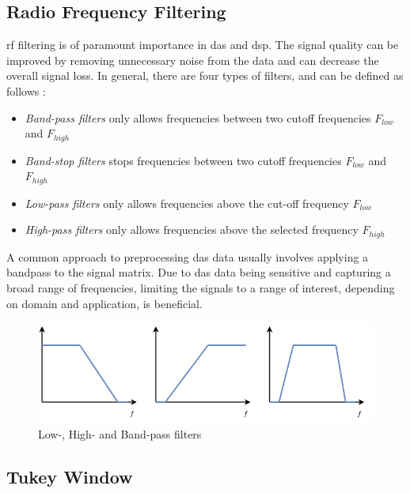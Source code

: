 \subsection{Radio Frequency Filtering}
%
\acrfull{rf} filtering is of paramount importance in \acrshort{das} and \acrfull{dsp}. The signal quality can be improved by removing unnecessary noise from the data and can decrease the overall signal loss. In general, there are four types of filters, and can be defined as follows \cite{cdt21_filters}:
%
\begin{itemize}
    \item \textit{Band-pass filters} only allows frequencies between two cutoff frequencies $F_{low}$ and $F_{high}$
    \item \textit{Band-stop filters} stops frequencies between two cutoff frequencies $F_{low}$ and $F_{high}$
    \item \textit{Low-pass filters} only allows frequencies above the cut-off frequency $F_{low}$
    \item \textit{High-pass filters} only allows frequencies above the selected frequency $F_{high}$
\end{itemize}
%
A common approach to preprocessing \acrshort{das} data usually involves applying a bandpass to the signal matrix. Due to \acrshort{das} data being sensitive and capturing a broad range of frequencies, limiting the signals to a range of interest, depending on domain and application, is beneficial.

\vspace{0.5cm}

\begin{figure}[!h]
    \centering
    \includegraphics[width=0.8\linewidth]{figures/lowhighpass.png}
    \caption{Low-, High- and Band-pass filters}
    \label{fig:rffilters}
\end{figure}
%
\subsection{Tukey Window}
\label{dsp:tukey}


